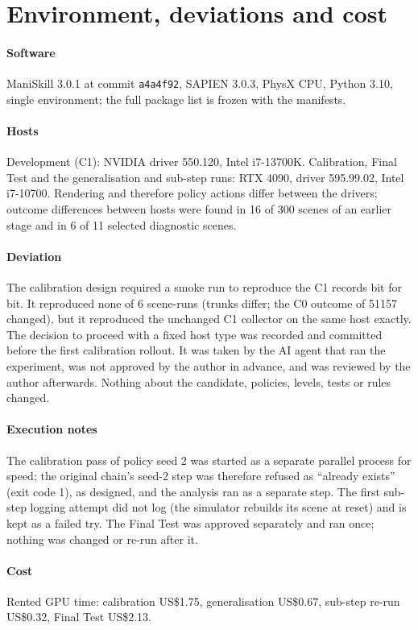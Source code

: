 \section{Environment, deviations and cost}\label{sec:s-env}

\paragraph{Software} ManiSkill 3.0.1 at commit \texttt{a4a4f92}, SAPIEN 3.0.3, PhysX CPU, Python 3.10, single environment; the full package list is frozen with the manifests.

\paragraph{Hosts} Development (C1): NVIDIA driver 550.120, Intel i7-13700K. Calibration, Final Test and the generalisation and sub-step runs: RTX 4090, driver 595.99.02, Intel i7-10700. Rendering and therefore policy actions differ between the drivers; outcome differences between hosts were found in 16 of 300 scenes of an earlier stage and in 6 of 11 selected diagnostic scenes.

\paragraph{Deviation} The calibration design required a smoke run to reproduce the C1 records bit for bit. It reproduced none of 6 scene-runs (trunks differ; the C0 outcome of 51157 changed), but it reproduced the unchanged C1 collector on the same host exactly. The decision to proceed with a fixed host type was recorded and committed before the first calibration rollout. It was taken by the AI agent that ran the experiment, was not approved by the author in advance, and was reviewed by the author afterwards. Nothing about the candidate, policies, levels, tests or rules changed.

\paragraph{Execution notes} The calibration pass of policy seed 2 was started as a separate parallel process for speed; the original chain's seed-2 step was therefore refused as ``already exists'' (exit code 1), as designed, and the analysis ran as a separate step. The first sub-step logging attempt did not log (the simulator rebuilds its scene at reset) and is kept as a failed try. The Final Test was approved separately and ran once; nothing was changed or re-run after it.

\paragraph{Cost} Rented GPU time: calibration US\$1.75, generalisation US\$0.67, sub-step re-run US\$0.32, Final Test US\$2.13.
